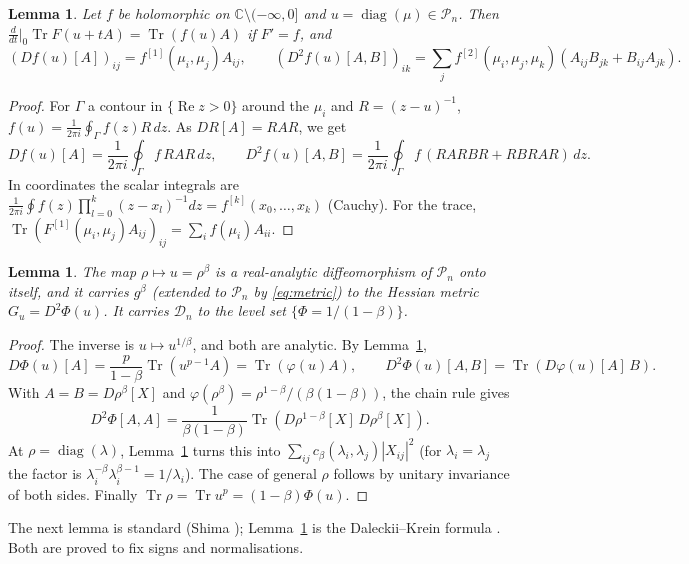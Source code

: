 \documentclass[11pt]{amsart}
\newtheorem{lemma}[theorem]{Lemma}
\theoremstyle{definition}
\numberwithin{equation}{section}
\newcommand{\C}{\mathbb{C}}
\newcommand{\Pn}{\mathcal{P}_n}
\newcommand{\Dn}{\mathcal{D}_n}
\newcommand{\Tr}{\operatorname{Tr}}
\begin{document}
\begin{lemma}\label{lem:dk}
Let $f$ be holomorphic on $\C\setminus(-\infty,0]$ and $u=\operatorname{diag}(\mu)\in\Pn$. Then
$\frac{d}{dt}\big|_0\Tr F(u+tA)=\Tr(f(u)A)$ if $F'=f$, and
\[
(Df(u)[A])_{ij}=f^{[1]}(\mu_i,\mu_j)A_{ij},\qquad
(D^2f(u)[A,B])_{ik}=\sum_jf^{[2]}(\mu_i,\mu_j,\mu_k)(A_{ij}B_{jk}+B_{ij}A_{jk}).
\]
\end{lemma}
\begin{proof}
For $\Gamma$ a contour in $\{\operatorname{Re}z>0\}$ around the $\mu_i$ and $R=(z-u)^{-1}$, $f(u)=\frac1{2\pi i}\oint_\Gamma f(z)R\,dz$. As $DR[A]=RAR$, we get
\[Df(u)[A]=\frac1{2\pi i}\oint_\Gamma f\,RAR\,dz,\qquad D^2f(u)[A,B]=\frac1{2\pi i}\oint_\Gamma f\,(RARBR+RBRAR)\,dz .\]
In coordinates the scalar integrals are
$\frac1{2\pi i}\oint f(z)\prod_{l=0}^{k}(z-x_l)^{-1}dz=f^{[k]}(x_0,\dots,x_k)$ (Cauchy). For the trace, $\Tr(F^{[1]}(\mu_i,\mu_j)A_{ij})_{ij}=\sum_if(\mu_i)A_{ii}$.
\end{proof}

\begin{lemma}\label{lem:hessian}
The map $\rho\mapsto u=\rho^\beta$ is a real-analytic diffeomorphism of $\Pn$ onto itself, and it carries $g^\beta$ (extended to $\Pn$ by
\eqref{eq:metric}) to the Hessian metric $G_u=D^2\Phi(u)$. It carries $\Dn$ to the level set $\{\Phi=1/(1-\beta)\}$.
\end{lemma}
\begin{proof}
The inverse is $u\mapsto u^{1/\beta}$, and both are analytic. By Lemma~\ref{lem:dk},
\[D\Phi(u)[A]=\frac{p}{1-\beta}\Tr(u^{p-1}A)=\Tr(\varphi(u)A),\qquad D^2\Phi(u)[A,B]=\Tr(D\varphi(u)[A]\,B).\] With $A=B=D\rho^\beta[X]$ and $\varphi(\rho^\beta)=\rho^{1-\beta}/(\beta(1-\beta))$, the chain rule gives
\[D^2\Phi[A,A]=\frac{1}{\beta(1-\beta)}\Tr(D\rho^{1-\beta}[X]\,D\rho^\beta[X]).\]
At $\rho=\operatorname{diag}(\lambda)$, Lemma~\ref{lem:dk} turns this into
$\sum_{ij}c_\beta(\lambda_i,\lambda_j)|X_{ij}|^2$ (for $\lambda_i=\lambda_j$ the factor is $\lambda_i^{-\beta}\lambda_i^{\beta-1}=1/\lambda_i$). The case of general $\rho$ follows by unitary
invariance of both sides. Finally $\Tr\rho=\Tr u^p=(1-\beta)\Phi(u)$.
\end{proof}

\noindent The next lemma is standard (Shima \cite{shima}); Lemma~\ref{lem:dk} is the Daleckii--Krein formula \cite{bhatia}. Both are proved to fix signs and normalisations.
\end{document}
